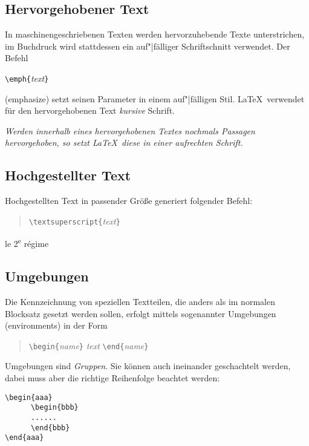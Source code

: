 \subsection{Hervorgehobener Text}

In maschinengeschriebenen Texten werden hervorzuhebende Texte
unterstrichen, im Buchdruck wird stattdessen ein auf"|fälliger
Schriftschnitt verwendet.
Der Befehl
\begin{beispiel}
\lstinline|\emph{|\textit{text}\lstinline|}|
\end{beispiel}
(emphasize) setzt seinen Parameter in einem auf"|fälligen Stil.
\LaTeX\ verwendet für den hervorgehobenen Text \textit{kursive}
Schrift.

\begin{LTXexample}
\emph{Werden innerhalb eines
hervorgehobenen Textes
\emph{nochmals} Passagen
hervorgehoben, so setzt
\LaTeX\ diese in einer
\emph{aufrechten} Schrift.}
\end{LTXexample}



\subsection{Hochgestellter Text}
Hochgestellten Text in passender Größe generiert folgender Befehl:
\begin{quote}
\lstinline|\textsuperscript{|\textit{text}\lstinline|}|
\end{quote}

\begin{LTXexample}
le 2\textsuperscript{e}
r\'egime
\end{LTXexample}





\subsection{Umgebungen} \label{env}

Die Kennzeichnung von speziellen Textteilen, die anders als im
normalen Blocksatz gesetzt werden sollen, erfolgt mittels
sogenannter Umgebungen (environments) in der Form
\begin{quote}
\lstinline|\begin{|\textit{name}\lstinline|}|\quad
   \textit{text}\quad
   \lstinline|\end{|\textit{name}\lstinline|}|
\end{quote}
Umgebungen sind \emph{Gruppen}.
Sie können auch ineinander geschachtelt werden, dabei muss aber
die richtige Reihenfolge beachtet werden:
\begin{beispiel}
\begin{lstlisting}
\begin{aaa}
      \begin{bbb}
      ......
      \end{bbb}
\end{aaa}
\end{lstlisting}
\end{beispiel}


